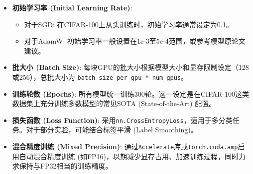\documentclass[a4paper]{article}
\begin{document}
\begin{itemize}
\begin{itemize}
    \end{itemize}
    \item \textbf{初始学习率 (Initial Learning Rate)}:
    \begin{itemize}
        \item 对于SGD: 在CIFAR-100上从头训练时，初始学习率通常设定为0.1。
        \item 对于AdamW: 初始学习率一般设置在1e-3至5e-4范围，或参考模型原论文建议。
    \end{itemize}
    \item \textbf{批大小 (Batch Size)}: 每块GPU的批大小根据模型大小和显存限制设定（128或256），总批大小为 \texttt{batch\_size\_per\_gpu * num\_gpus}。
    \item \textbf{训练轮数 (Epochs)}: 所有模型统一训练300轮。这一设定是在CIFAR-100这类数据集上充分训练多数模型的常见SOTA (State-of-the-Art) 配置。
    \item \textbf{损失函数 (Loss Function)}: 采用\texttt{nn.CrossEntropyLoss}，适用于多分类任务。对于部分实验，可能结合标签平滑 (Label Smoothing)。
    \item \textbf{混合精度训练 (Mixed Precision)}: 通过\texttt{Accelerate}库或\texttt{torch.cuda.amp}启用自动混合精度训练 (如FP16)，以期减少显存占用、加速训练过程，同时力求保持与FP32相当的训练精度。
\end{itemize}
\end{document}
